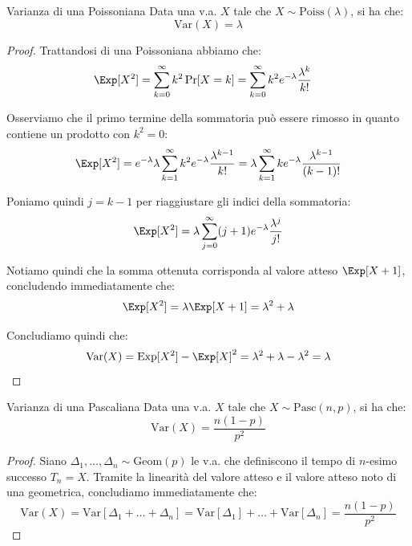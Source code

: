 \documentclass[a4paper, 12pt]{report}
\begin{document}
    \begin{framedprop}{Varianza di una Poissoniana}
        Data una v.a. $X$ tale che $X \sim \mathrm{Poiss}(\lambda)$, si ha che:
        \[\mathrm{Var}(X) = \lambda\]
    \end{framedprop}

    \begin{proof}
        Trattandosi di una Poissoniana abbiamo che:
        \[\begin{split}
            \Exp[X^2] &= \sum_{k=0}^{\infty} k^2 \Pr[X = k] = \sum_{k=0}^{\infty} k^2 e^{-\lambda} \frac{\lambda^k}{k!}
        \end{split}\]

        Osserviamo che il primo termine della sommatoria può essere rimosso in quanto contiene un prodotto con $k^2 = 0$: 
        \[\begin{split}
            \Exp[X^2] &= e^{-\lambda} \lambda \sum_{k=1}^{\infty} k^2 e^{-\lambda} \frac{\lambda^{k-1}}{k!} = \lambda \sum_{k=1}^{\infty} k e^{-\lambda} \frac{\lambda^{k-1}}{(k-1)!} \\
        \end{split}\]

        Poniamo quindi $j = k-1$ per riaggiustare gli indici della sommatoria:
        \[\Exp[X^2] = \lambda \sum_{j=0}^{\infty} (j+1) e^{-\lambda} \frac{\lambda^{j}}{j!}\]
        
        Notiamo quindi che la somma ottenuta corrisponda al valore atteso $\Exp[X+1]$, concludendo immediatamente che:
        \[ \Exp[X^2] = \lambda \Exp[X+1] = \lambda^2 + \lambda\]

        Concludiamo quindi che:
        \[\mathrm{Var}(X) = \mathrm{Exp}[X^2] - \Exp[X]^2 = \lambda^2 + \lambda - \lambda^2 = \lambda\]
    \end{proof}

    \begin{framedprop}{Varianza di una Pascaliana}
        Data una v.a. $X$ tale che $X \sim \mathrm{Pasc}(n,p)$, si ha che:
        \[\mathrm{Var}(X) = \frac{n(1-p)}{p^2}\]
    \end{framedprop}

    \begin{proof}
        Siano $\Delta_1, \ldots, \Delta_n \sim \mathrm{Geom}(p)$ le v.a. che definiscono il tempo di $n$-esimo successo $T_n = X$. Tramite la linearità del valore atteso e il valore atteso noto di una geometrica, concludiamo immediatamente che:
        \[\mathrm{Var}(X) = \mathrm{Var}[\Delta_1 + \ldots + \Delta_n] = \mathrm{Var}[\Delta_1] + \ldots + \mathrm{Var}[\Delta_n] = \frac{n(1-p)}{p^2}\]
    \end{proof}
\end{document}
